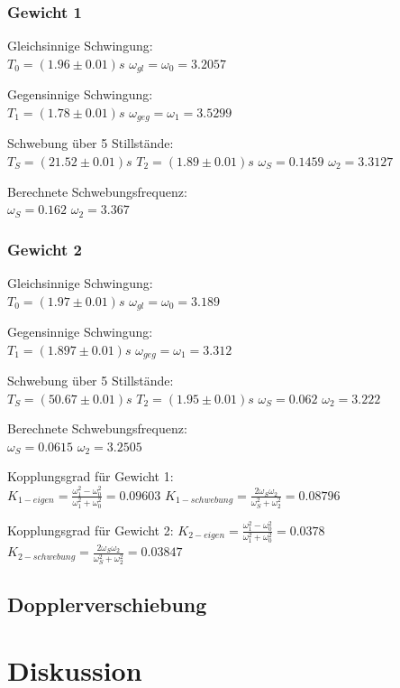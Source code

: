 \documentclass{article}
\begin{document}
\subsubsection{Gewicht 1}
Gleichsinnige Schwingung:\\
$T_0=(1.96 \pm 0.01)\si{s}$
$\omega_{gl}=\omega_0=3.2057$

Gegensinnige Schwingung:\\
$T_1=(1.78 \pm 0.01)\si{s}$
$\omega_{geg}=\omega_1=3.5299$

Schwebung über 5 Stillstände:\\
$T_S=(21.52 \pm 0.01)\si{s}$
$T_2=(1.89 \pm 0.01)\si{s}$
$\omega_S=0.1459$
$\omega_2=3.3127$

Berechnete Schwebungsfrequenz:\\
$\omega_S=0.162$
$\omega_2=3.367$

\subsubsection{Gewicht 2}
Gleichsinnige Schwingung:\\
$T_0=(1.97 \pm 0.01)\si{s}$
$\omega_{gl}=\omega_0=3.189$

Gegensinnige Schwingung:\\
$T_1=(1.897 \pm 0.01)\si{s}$
$\omega_{geg}=\omega_1=3.312$

Schwebung über 5 Stillstände:\\
$T_S=(50.67 \pm 0.01)\si{s}$
$T_2=(1.95 \pm 0.01)\si{s}$
$\omega_S=0.062$
$\omega_2=3.222$

Berechnete Schwebungsfrequenz:\\
$\omega_S=0.0615$
$\omega_2=3.2505$

Kopplungsgrad für Gewicht 1:\\
$K_{1-eigen}=\frac{\omega_1^2-\omega_0^2}{\omega_1^2+\omega_0^2}=0.09603$
$K_{1-schwebung}=\frac{2\omega_S \omega_2}{\omega_S^2 + \omega_2^2}=0.08796$

Kopplungsgrad für Gewicht 2:
$K_{2-eigen}=\frac{\omega_1^2-\omega_0^2}{\omega_1^2+\omega_0^2}=0.0378$
$K_{2-schwebung}=\frac{2\omega_S \omega_2}{\omega_S^2 + \omega_2^2}=0.03847$


\subsection{Dopplerverschiebung}


\section{Diskussion}
\end{document}
